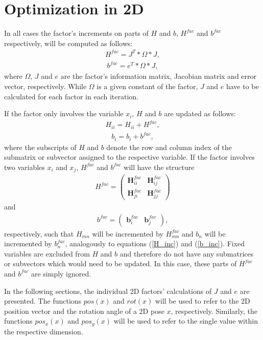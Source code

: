 \section{Optimization in 2D}

In all cases the factor's increments on parts of $H$ and $b$, $H^{fac}$ and $b^{fac}$ respectively, will be computed as follows:
\begin{align}
	H^{fac} = J^T * \Omega * J,
\end{align}
\begin{align}
	b^{fac} = e^T * \Omega * J,
\end{align}
where $\Omega$, $J$ and $e$ are the factor's information matrix, Jacobian matrix and error vector, respectively. While $\Omega$ is a given constant of the factor, $J$ and $e$ have to be calculated for each factor in each iteration.

If the factor only involves the variable $x_i$, $H$ and $b$ are updated as follows:
\begin{align}
\label{H_inc}
	H_{ii} = H_{ii} + H^{fac},
\end{align}
\begin{align}
\label{b_inc}
	b_i = b_i + b^{fac},
\end{align}
where the subscripts of $H$ and $b$ denote the row and column index of the submatrix or subvector assigned to the respective variable. If the factor involves two variables $x_i$ and $x_j$, $H^{fac}$ and $b^{fac}$ will have the structure
\begin{align}
H^{fac} =
\begin{pmatrix}
	\boldsymbol{H}^{fac}_{ii} & \boldsymbol{H}^{fac}_{ij}\\
	\boldsymbol{H}^{fac}_{ji} & \boldsymbol{H}^{fac}_{jj}
\end{pmatrix}
\end{align}
and
\begin{align}
b^{fac} =
\begin{pmatrix}
	\boldsymbol{b}^{fac}_{i} & \boldsymbol{b}^{fac}_{j}
\end{pmatrix},
\end{align}
respectively, such that $H_{mn}$ will be incremented by $H^{fac}_{mn}$ and $b_n$ will be incremented by $b^{fac}_n$, analogously to equations (\ref{H_inc}) and (\ref{b_inc}). Fixed variables are excluded from $H$ and $b$ and therefore do not have any submatrices or subvectors which would need to be updated. In this case, these parts of $H^{fac}$ and $b^{fac}$ are simply ignored.

In the following sections, the individual 2D factors' calculations of $J$ and $e$ are presented. The functions $pos(x)$ and $rot(x)$ will be used to refer to the 2D position vector and the rotation angle of a 2D pose $x$, respectively. Similarly, the functions $pos_x(x)$ and $pos_y(x)$ will be used to refer to the single value within the respective dimension.

